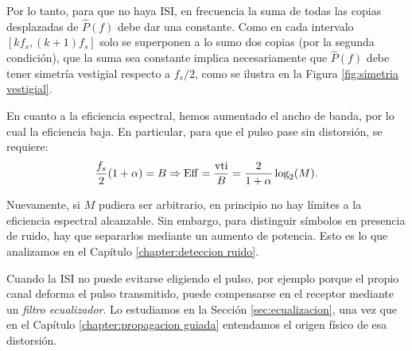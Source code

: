 Por lo tanto, para que no haya ISI, en frecuencia la suma de todas las copias desplazadas de $\hat{P}(f)$ debe dar una constante. Como en cada intervalo $[kf_s,(k+1)f_s]$ solo se superponen a lo sumo dos copias (por la segunda condición), que la suma sea constante implica necesariamente que $\hat{P}(f)$ debe tener simetría vestigial respecto a $f_s/2$, como se ilustra en la Figura \ref{fig:simetria vestigial}.

En cuanto a la eficiencia espectral, hemos aumentado el ancho de banda, por lo cual la eficiencia baja. En particular, para que el pulso pase sin distorsión, se requiere:
\begin{equation*}
    \frac{f_s}{2}(1+\alpha) = B \Rightarrow \mathrm{Eff} = \frac{\mathrm{vti}}{B} = \frac{2}{1+\alpha} \log_2 (M).
\end{equation*}

Nuevamente, si $M$ pudiera ser arbitrario, en principio no hay límites a la eficiencia espectral alcanzable. Sin embargo, para distinguir símbolos en presencia de ruido, hay que separarlos mediante un aumento de potencia. Esto es lo que analizamos en el Capítulo \ref{chapter:deteccion ruido}.

Cuando la ISI no puede evitarse eligiendo el pulso, por ejemplo porque el propio canal deforma el pulso transmitido, puede compensarse en el receptor mediante un \emph{filtro ecualizador}. Lo estudiamos en la Sección \ref{sec:ecualizacion}, una vez que en el Capítulo \ref{chapter:propagacion guiada} entendamos el origen físico de esa distorsión.
